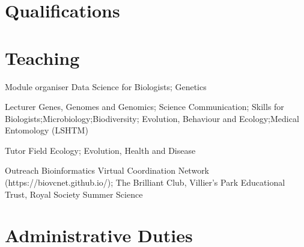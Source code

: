 \documentclass[11pt, a4paper]{awesome-cv}
\begin{document}
\hypertarget{qualifications}{%
\section{Qualifications}\label{qualifications}}

\begin{cventries}
    \vspace{-4.0mm}
\end{cventries}

\hypertarget{teaching}{%
\section{Teaching}\label{teaching}}

\begin{cvskills}
  \cvskill
    {Module organiser}
    {Data Science for Biologists; \newline Genetics}
    
  \cvskill
    {Lecturer}
    {Genes, Genomes and Genomics; Science Communication; Skills for Biologists;\newline Microbiology;Biodiversity; Evolution, Behaviour and Ecology;\newline Medical Entomology (LSHTM)}
   
  \cvskill
    {Tutor}
    {Field Ecology; Evolution, Health and Disease}  
    
  \cvskill
    {Outreach}
    {Bioinformatics Virtual Coordination Network (https://biovcnet.github.io/); \newline The Brilliant Club, Villier's Park Educational Trust, Royal Society Summer Science} 
    
\end{cvskills}

\hypertarget{administrative-duties}{%
\section{Administrative Duties}\label{administrative-duties}}

\begin{cventries}
    \vspace{-4.0mm}
    \vspace{-4.0mm}
    \vspace{-4.0mm}
\end{cventries}
\end{document}
